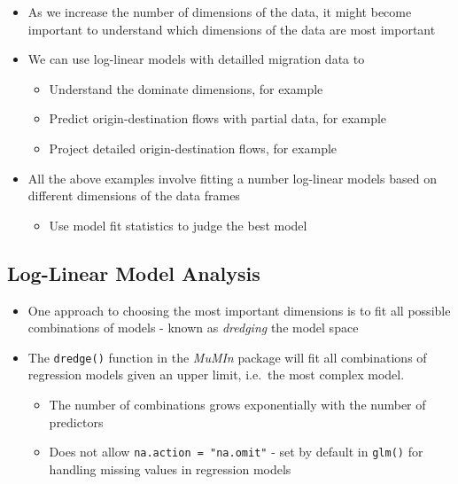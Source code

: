 \documentclass[
]{book}
\providecommand{\tightlist}{%
  \setlength{\itemsep}{0pt}\setlength{\parskip}{0pt}}
\begin{document}
\begin{itemize}
\tightlist
\item
  As we increase the number of dimensions of the data, it might become important to understand which dimensions of the data are most important
\item
  We can use log-linear models with detailled migration data to

  \begin{itemize}
  \tightlist
  \item
    Understand the dominate dimensions, for example \citet{VanImhoff1997} \citet{rogers2002dms}
  \item
    Predict origin-destination flows with partial data, for example \citet{deBeer2010} \citet{Rogers2003a} \citet{Raymer2007b}
  \item
    Project detailed origin-destination flows, for example \citet{Raymer2006}
  \end{itemize}
\item
  All the above examples involve fitting a number log-linear models based on different dimensions of the data frames

  \begin{itemize}
  \tightlist
  \item
    Use model fit statistics to judge the best model
  \end{itemize}
\end{itemize}

\hypertarget{log-linear-model-analysis-1}{%
\subsection{Log-Linear Model Analysis}\label{log-linear-model-analysis-1}}

\begin{itemize}
\tightlist
\item
  One approach to choosing the most important dimensions is to fit all possible combinations of models - known as \emph{dredging} the model space
\item
  The \texttt{dredge()} function in the \emph{MuMIn} package will fit all combinations of regression models given an upper limit, i.e.~the most complex model.

  \begin{itemize}
  \tightlist
  \item
    The number of combinations grows exponentially with the number of predictors
  \item
    Does not allow \texttt{na.action\ =\ "na.omit"} - set by default in \texttt{glm()} for handling missing values in regression models
  \end{itemize}
\end{itemize}
\end{document}
